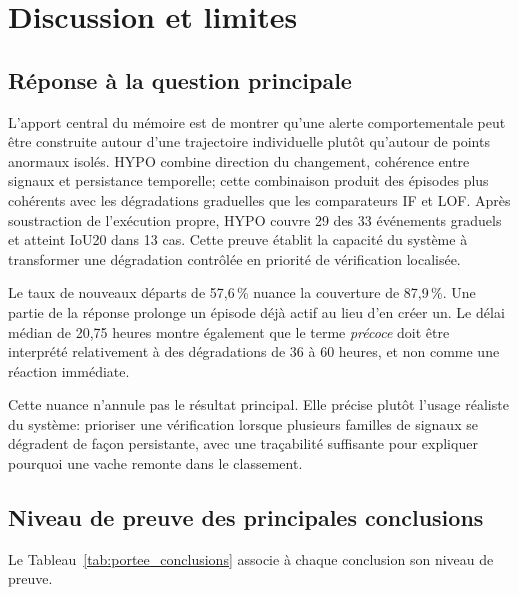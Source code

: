\chapter{Discussion et limites}
\label{chapitre:discussion}

\section{Réponse à la question principale}

L'apport central du mémoire est de montrer qu'une alerte comportementale peut être construite
autour d'une trajectoire individuelle plutôt qu'autour de points anormaux isolés. HYPO combine
direction du changement, cohérence entre signaux et persistance temporelle; cette combinaison
produit des épisodes plus cohérents avec les dégradations graduelles que les comparateurs IF
et LOF. Après soustraction de l'exécution propre, HYPO couvre 29 des 33 événements graduels et
atteint IoU20 dans 13 cas. Cette preuve établit la capacité du système à transformer une
dégradation contrôlée en priorité de vérification localisée.

Le taux de nouveaux départs de 57,6\,\% nuance la couverture de 87,9\,\%. Une partie de la
réponse prolonge un épisode déjà actif au lieu d'en créer un. Le délai médian de 20,75 heures
montre également que le terme \textit{précoce} doit être interprété relativement à des
dégradations de 36 à 60 heures, et non comme une réaction immédiate.

Cette nuance n'annule pas le résultat principal. Elle précise plutôt l'usage réaliste du
système: prioriser une vérification lorsque plusieurs familles de signaux se dégradent de
façon persistante, avec une traçabilité suffisante pour expliquer pourquoi une vache remonte
dans le classement.

\section{Niveau de preuve des principales conclusions}

Le Tableau~\ref{tab:portee_conclusions} associe à chaque conclusion son niveau de preuve.

